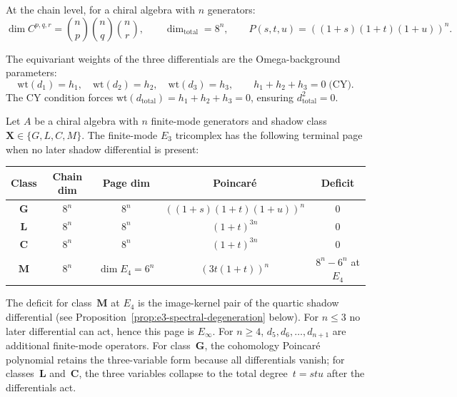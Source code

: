 At the chain level, for a chiral algebra with $n$ generators:
\begin{equation}\label{eq:e3-tricomplex-chain-dim}
 \dim C^{p,q,r} = \binom{n}{p}\binom{n}{q}\binom{n}{r},
 \qquad
 \dim_{\mathrm{total}} = 8^n,
 \qquad
 P(s,t,u) = ((1+s)(1+t)(1+u))^n.
\end{equation}

The equivariant weights of the three differentials are the Omega-background parameters:
\[
 \mathrm{wt}(d_1) = h_1, \quad \mathrm{wt}(d_2) = h_2, \quad \mathrm{wt}(d_3) = h_3,
 \qquad h_1 + h_2 + h_3 = 0 \;\text{(CY)}.
\]
The CY condition forces $\mathrm{wt}(d_{\mathrm{total}}) = h_1 + h_2 + h_3 = 0$, ensuring $d_{\mathrm{total}}^2 = 0$.

\begin{proposition}
\label{prop:tricomplex-dimensions}
Let \(A\) be a chiral algebra with \(n\) finite-mode generators and shadow class \(\mathbf X\in\{G,L,C,M\}\). The finite-mode \(E_3\) tricomplex has the following terminal page when no later shadow differential is present:
\begin{center}
\small
\renewcommand{\arraystretch}{1.15}
\begin{tabular}{ccccc}
\toprule
\textbf{Class} & \textbf{Chain dim} & \textbf{Page dim} & \textbf{Poincar\'e} & \textbf{Deficit} \\
\midrule
$\mathbf{G}$ & $8^n$ & $8^n$ & $((1+s)(1+t)(1+u))^n$ & $0$ \\
$\mathbf{L}$ & $8^n$ & $8^n$ & $(1+t)^{3n}$ & $0$ \\
$\mathbf{C}$ & $8^n$ & $8^n$ & $(1+t)^{3n}$ & $0$ \\
$\mathbf{M}$ & $8^n$ & $\dim E_4=6^n$ & $(3t(1+t))^n$ & $8^n - 6^n$ at \(E_4\) \\
\bottomrule
\end{tabular}
\end{center}
The deficit for class~$\mathbf{M}$ at \(E_4\) is the image-kernel pair of the quartic shadow differential (see Proposition~\ref{prop:e3-spectral-degeneration} below). For \(n\leq3\) no later differential can act, hence this page is \(E_\infty\). For \(n\geq4\), \(d_5,d_6,\ldots,d_{n+1}\) are additional finite-mode operators. For class~$\mathbf{G}$, the cohomology Poincar\'e polynomial retains the three-variable form because all differentials vanish; for classes~$\mathbf{L}$ and~$\mathbf{C}$, the three variables collapse to the total degree~$t = stu$ after the differentials act.
\end{proposition}

